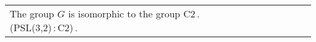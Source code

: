 \documentclass[border=10]{standalone}
\begin{document}
\begin{tabular}{@{}l@{}l@{}l@{}l@{}l@{}l@{}l@{}l@{}}
The group $G$ is isomorphic to the group C2\,.\,(PSL(3,2)\,:\,C2)\,.\\

\end{tabular}
\end{document}
